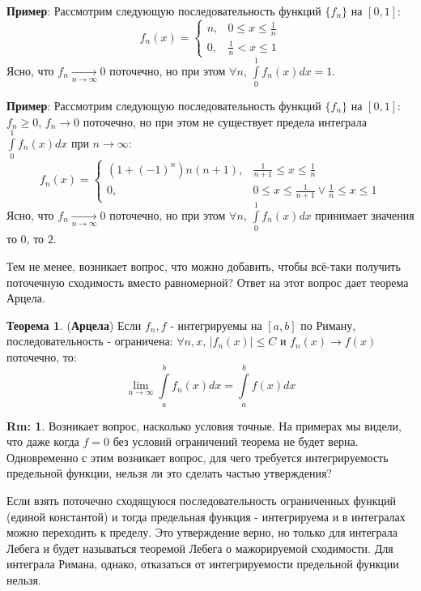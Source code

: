 \documentclass[12pt]{article}
\theoremstyle{definition}
\newtheorem{rem}{Rm:}
\newtheorem{theorem}{Теорема}
\newcommand{\ddint}[2]{\displaystyle\int\limits_{#1}^{#2}}
\begin{document}
\textbf{Пример}: Рассмотрим следующую последовательность функций $\{f_n\}$ на $[0,1]$:
$$
	f_n(x) = 
	\begin{cases}
		n, & 0 \leq x \leq \tfrac{1}{n}\\
		0,& \tfrac{1}{n} < x \leq 1
		 
	\end{cases}
$$
Ясно, что $f_n \xrightarrow[n \to \infty]{}0$ поточечно, но при этом $\forall n, \, \ddint{0}{1}f_n(x)dx = 1$.

\textbf{Пример}: Рассмотрим следующую последовательность функций $\{f_n\}$ на $[0,1]$: $f_n \geq 0$, $f_n \to 0$ поточечно, но при этом не существует предела интеграла $\ddint{0}{1}f_n(x)dx$ при $n \to \infty$:
$$
	f_n(x) = 
	\begin{cases}
		(1 + (-1)^n)n(n+1), & \tfrac{1}{n+1} \leq x \leq \tfrac{1}{n} \\
		0,& 0 \leq x \leq \tfrac{1}{n+1} \vee \tfrac{1}{n} \leq x \leq 1
		
	\end{cases}
$$
Ясно, что $f_n \xrightarrow[n \to \infty]{}0$ поточечно, но при этом $\forall n, \, \ddint{0}{1}f_n(x)dx$ принимает значения то $0$, то $2$.

Тем не менее, возникает вопрос, что можно добавить, чтобы всё-таки получить поточечную сходимость вместо равномерной? Ответ на этот вопрос дает теорема Арцела.
\begin{theorem}(\textbf{Арцела})
	Если $f_n, f$ - интегрируемы на $[a,b]$ по Риману, последовательность - ограничена: $\forall n, x, \, |f_n(x)| \leq C$ и $f_n(x) \to f(x)$ поточечно, то:
	$$
		\lim\limits_{n \to \infty} \ddint{a}{b}f_n(x) dx = \ddint{a}{b}f(x)dx
	$$
\end{theorem}
\begin{rem}
	Возникает вопрос, насколько условия точные. На примерах мы видели, что даже когда $f = 0$ без условий ограничений теорема не будет верна. Одновременно с этим возникает вопрос, для чего требуется интегрируемость предельной функции, нельзя ли это сделать частью утверждения? 
	
	Если взять поточечно сходящуюся последовательность ограниченных функций (единой константой) и тогда предельная функция - интегрируема и в интегралах можно переходить к пределу. Это утверждение верно, но только для интеграла Лебега и будет называться теоремой Лебега о мажорируемой сходимости. Для интеграла Римана, однако, отказаться от интегрируемости предельной функции нельзя.
\end{rem}
\end{document}
